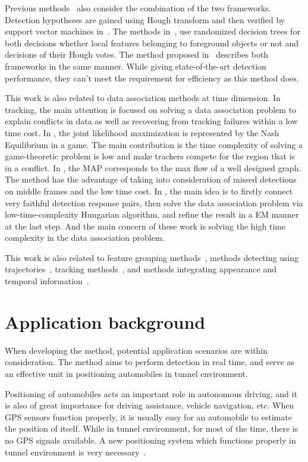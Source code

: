 Previous methods~\cite{ac34} also consider the combination of the two frameworks. Detection hypotheses are gained using Hough transform and then verified by support vector machines in~\cite{ac10,ac25}. The methods in~\cite{ac6,ac7}, use randomized decision trees for both decisions whether local features belonging to foreground objects or not and decisions of their Hough votes. The method proposed in~\cite{ac27} describes both frameworks in the same manner. While giving state-of-the-art detection performance, they can't meet the requirement for efficiency as this method does.

This work is also related to data association methods at time dimension. In tracking, the main attention is focused on solving a data
association problem to explain conflicts in data as well as
recovering from tracking failures within a low time cost. In
\cite{ij9}, the joint likelihood maximization is represented by the
Nash Equilibrium in a game. The main contribution is the time
complexity of solving a game-theoretic problem is low and make
trackers compete for the region that is in a conflict. In
\cite{ij10}, the MAP corresponds to the max flow of a well designed
graph. The method has the advantage of taking into consideration of
missed detections on middle frames and the low time cost. In
\cite{ij11}, the main idea is to firstly connect very faithful
detection response pairs, then solve the data association problem
via low-time-complexity Hungarian algorithm, and refine the result
in a EM manner at the last step. And the main concern of these work
is solving the high time complexity in the data association problem.

 This work is also related to feature grouping methods~\cite{ac25}, methods detecting using trajectories~\cite{my9,ac24}, tracking methods~\cite{my7,my10}, and methods integrating appearance and temporal information~\cite{ac23}.


\section{Application background}
\label{ab}

When developing the method, potential application scenarios are within consideration. The method aims to perform detection in real time, and serve as an effective unit in positioning automobiles in tunnel environment.

Positioning of automobiles acts an important role in autonomous driving, and it is also of great importance for driving assistance, vehicle navigation, etc. When GPS sensors function properly, it is usually easy for an automobile to estimate the position of  itself. While in tunnel environment, for most of the time, there is no GPS signals available. A new positioning system which functions properly in tunnel environment is very necessary~\cite{nig}.

